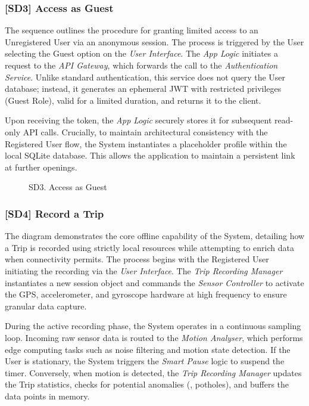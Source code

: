 \subsubsection*{[SD3] Access as Guest}
The sequence outlines the procedure for granting limited access to an Unregistered User via an anonymous session. The process is triggered by the User selecting the Guest option on the \emph{User Interface}. The \emph{App Logic} initiates a request to the \emph{API Gateway}, which forwards the call to the \emph{Authentication Service}. Unlike standard authentication, this service does not query the User database; instead, it generates an ephemeral JWT with restricted privileges (Guest Role), valid for a limited duration, and returns it to the client.

Upon receiving the token, the \emph{App Logic} securely stores it for subsequent read-only API calls. Crucially, to maintain architectural consistency with the Registered User flow, the System instantiates a placeholder profile within the local SQLite database. This allows the application to maintain a persistent link at further openings.
\vspace{1cm}
\begin{figure}[H]
    \centering
    
    \caption{SD3. Access as Guest}
    \label{fig:SD3}
\end{figure}
\newpage
\subsubsection*{[SD4] Record a Trip}
The diagram demonstrates the core offline capability of the System, detailing how a Trip is recorded using strictly local resources while attempting to enrich data when connectivity permits. The process begins with the Registered User initiating the recording via the \emph{User Interface}. The \emph{Trip Recording Manager} instantiates a new session object and commands the \emph{Sensor Controller} to activate the GPS, accelerometer, and gyroscope hardware at high frequency to ensure granular data capture.

During the active recording phase, the System operates in a continuous sampling loop. Incoming raw sensor data is routed to the \emph{Motion Analyser}, which performs edge computing tasks such as noise filtering and motion state detection. If the User is stationary, the System triggers the \emph{Smart Pause} logic to suspend the timer. Conversely, when motion is detected, the \emph{Trip Recording Manager} updates the Trip statistics, checks for potential anomalies (\eg, potholes), and buffers the data points in memory.

